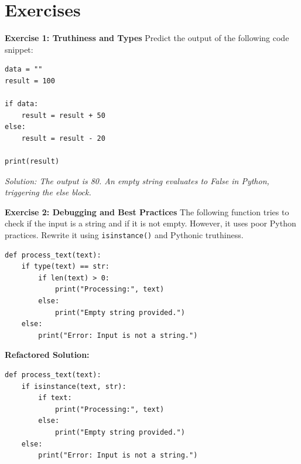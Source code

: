 
\section{Exercises}

\textbf{Exercise 1: Truthiness and Types}
Predict the output of the following code snippet:

\begin{lstlisting}
data = ""
result = 100

if data:
    result = result + 50
else:
    result = result - 20

print(result)
\end{lstlisting}
\textit{Solution: The output is 80. An empty string evaluates to False in Python, triggering the else block.}

\vspace{1em}
\textbf{Exercise 2: Debugging and Best Practices}
The following function tries to check if the input is a string and if it is not empty. However, it uses poor Python practices. Rewrite it using \texttt{isinstance()} and Pythonic truthiness.

\begin{lstlisting}
def process_text(text):
    if type(text) == str:
        if len(text) > 0:
            print("Processing:", text)
        else:
            print("Empty string provided.")
    else:
        print("Error: Input is not a string.")
\end{lstlisting}

\textbf{Refactored Solution:}
\begin{lstlisting}
def process_text(text):
    if isinstance(text, str):
        if text:
            print("Processing:", text)
        else:
            print("Empty string provided.")
    else:
        print("Error: Input is not a string.")
\end{lstlisting}
